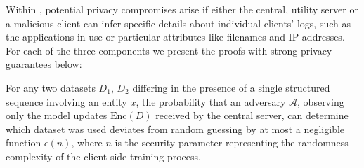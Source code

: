


Within \Sys, potential privacy compromises arise if either the central, utility server or a malicious client can infer specific details about individual clients' logs, such as the applications in use or particular attributes like filenames and IP addresses. For each of the three components we present the proofs with strong privacy guarantees below:

\begin{theorem}
    For any two datasets \(D_1\), \(D_2\) differing in the presence of a single structured sequence involving an entity \(x\), the probability that an adversary \(\mathcal{A}\), observing only the model updates \(\text{Enc}(D)\) received by the central server, can determine which dataset was used deviates from random guessing by at most a negligible function \(\epsilon(n)\), where \(n\) is the security parameter representing the randomness complexity of the client-side training process.
\end{theorem}

